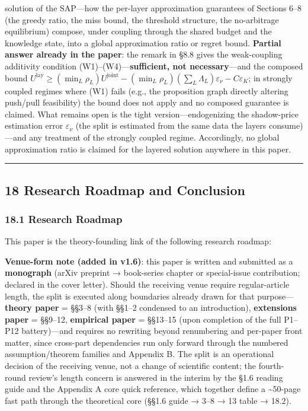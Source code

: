 \documentclass[
  11pt]{article}
\begin{document}
\begin{itemize}
  solution of the SAP---how the per-layer approximation guarantees of
  Sections 6--8 (the greedy ratio, the miss bound, the threshold
  structure, the no-arbitrage equilibrium) compose, under coupling
  through the shared budget and the knowledge state, into a global
  approximation ratio or regret bound. \textbf{Partial answer already in
  the paper}: the remark in §8.8 gives the weak-coupling additivity
  condition (W1)--(W4)---\textbf{sufficient, not necessary}---and the
  composed bound
  \(U^{\mathrm{lay}} \ge (\min_L \rho_L)U^{\mathrm{joint}} - (\min_L \rho_L)(\sum_L \Lambda_L)\varepsilon_\nu - C\varepsilon_K\);
  in strongly coupled regimes where (W1) fails (e.g., the proposition
  graph directly altering push/pull feasibility) the bound does not
  apply and no composed guarantee is claimed. What remains open is the
  tight version---endogenizing the shadow-price estimation error
  \(\varepsilon_\nu\) (the split is estimated from the same data the
  layers consume)---and any treatment of the strongly coupled regime.
  Accordingly, no global approximation ratio is claimed for the layered
  solution anywhere in this paper.
\end{itemize}

\begin{center}\rule{0.5\linewidth}{0.5pt}\end{center}

\subsection{18 Research Roadmap and
Conclusion}\label{research-roadmap-and-conclusion}

\subsubsection{18.1 Research Roadmap}\label{research-roadmap}

This paper is the theory-founding link of the following research
roadmap:

\textbf{Venue-form note (added in v1.6)}: this paper is written and
submitted as a \textbf{monograph} (arXiv preprint → book-series chapter
or special-issue contribution; declared in the cover letter). Should the
receiving venue require regular-article length, the split is executed
along boundaries already drawn for that purpose---\textbf{theory paper}
= §§3--8 (with §§1--2 condensed to an introduction), \textbf{extensions
paper} = §§9--12, \textbf{empirical paper} = §§13--15 (upon completion
of the full P1--P12 battery)---and requires no rewriting beyond
renumbering and per-paper front matter, since cross-part dependencies
run only forward through the numbered assumption/theorem families and
Appendix B. The split is an operational decision of the receiving venue,
not a change of scientific content; the fourth-round review's length
concern is answered in the interim by the §1.6 reading guide and the
Appendix A core quick reference, which together define a
\textasciitilde50-page fast path through the theoretical core (§§1.6
guide → 3--8 → 13 table → 18.2).
\end{document}
